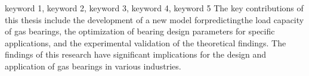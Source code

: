 \documentclass[a4paper, twoside, openany]{NCEPUMaster}
\begin{document}
  \maketitlepage            %
  \makechinainfopage        %
  \makeenglishinfopage      %
  \makestatement            %
  \clearpage
  \setcounter{page}{1} %


  \begin{abstract}{关键词1；关键词2；关键词3；关键词4；关键词5}
  \sloppy  %
  摘要是论文内容的高度概括，应具有独立性和自含性，即不阅读论文的全文，就能获得必要的信息。摘要应包括本论文的目的、主要研究内容、研究方法、创造性成果及其理论与实际意义。摘要中不宜使用公式、化学结构式、图表和非公知公用的符号和术语，不标注引用文献编号。避免将摘要写成目录式的内容介绍。

  \end{abstract}


  \begin{enabstract}{keyword 1, keyword 2, keyword 3, keyword 4, keyword 5}
  \sloppy  %
  The key contributions of this thesis include the development of a new model forpredictingthe load capacity of gas bearings, the optimization of bearing design parameters for specific applications, and the experimental validation of the theoretical findings. The findings of this research have significant implications for the design and application of gas bearings in various industries.
  \end{enabstract}

  \contents %
  
  \listoffiguresandtables  %

\clearpage
{}
\end{document}
